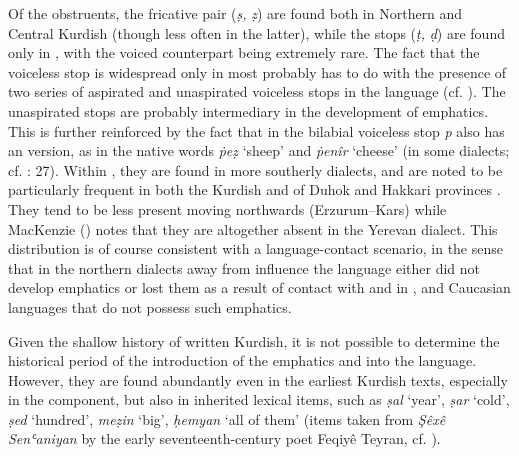 \documentclass[output=paper]{langsci/langscibook}
\begin{document}
Of the  obstruents, the fricative pair (\textit{ṣ,} \textit{ẓ}) are found both in {Northern} and {Central Kurdish} (though less often in the latter), while the stops (\textit{ṭ,} \textit{ḍ}) are found only in , with the voiced counterpart being extremely rare. The fact that the voiceless  stop is widespread only in  most probably has to do with the presence of two series of aspirated and unaspirated voiceless stops in the language (cf. ). The unaspirated stops are probably intermediary in the development of emphatics. This is further reinforced by the fact that in  the bilabial voiceless stop \textit{p} also has an  version, as in the native words \textit{ṗeẓ} ‘sheep’ and \textit{ṗenîr} ‘cheese’ (in some dialects; cf. \citealt{Kahn1976}: 27). Within , they are found in more southerly dialects, and are noted to be particularly frequent in both the Kurdish and  of Duhok and Hakkari provinces  \citep[329]{Blau1989}. They tend to be less present moving northwards (Erzurum–Kars) while MacKenzie (\citeyear[43]{MacKenzie1961}) notes that they are altogether absent in the Yerevan dialect. This distribution is of course consistent with a language-contact scenario, in the sense that in the northern dialects away from  influence the language either did not develop emphatics or lost them as a result of contact with and  in ,  and Caucasian languages that do not possess such emphatics.   

Given the shallow history of written Kurdish, it is not possible to determine the historical period of the introduction of the emphatics and  into the language. However, they are found abundantly even in the earliest Kurdish texts, especially in the  component, but also in inherited lexical items, such as \textit{ṣal} ‘year’, \textit{ṣar} ‘cold’, \textit{ṣed} ‘hundred’, \textit{meẓin} ‘big’, \textit{ḥemyan} ‘all of them’ (items taken from \textit{Şêxê} \textit{Senʿaniyan} by the early seventeenth-century poet Feqiyê Teyran, cf. \citealt{Teyran2011}). 
\end{document}

